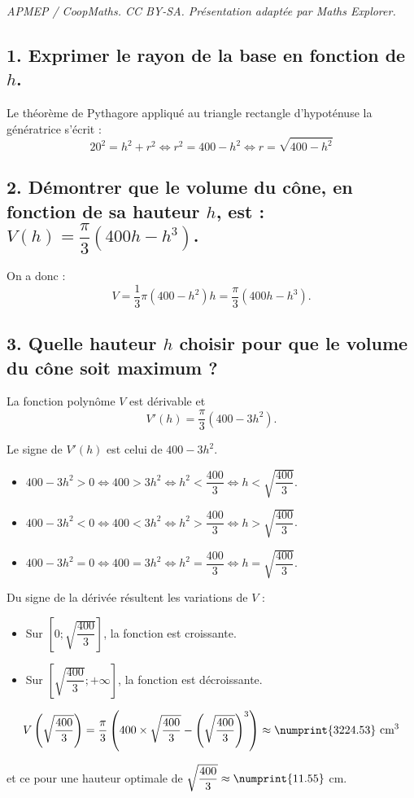 \documentclass[10pt]{article}
\begin{document}
\noindent\textit{APMEP / CoopMaths. CC BY-SA. Présentation adaptée par Maths Explorer.}\par\medskip
\subsection*{1. Exprimer le rayon de la base en fonction de $h$.}
	
	Le théorème de Pythagore appliqué au triangle rectangle d'hypoténuse la génératrice s'écrit :
	\[
	20^2 = h^2 + r^2 \iff r^2 = 400 - h^2 \iff r = \sqrt{400 - h^2}
	\]
	
	\subsection*{2. Démontrer que le volume du cône, en fonction de sa hauteur $h$, est : $V(h) = \dfrac{\pi}{3}(400h - h^3)$.}
	
	On a donc :
	\[
	V = \dfrac{1}{3} \pi (400 - h^2)h = \dfrac{\pi}{3}(400h - h^3).
	\]
	
	\subsection*{3. Quelle hauteur $h$ choisir pour que le volume du cône soit maximum ?}
	
	La fonction polynôme $V$ est dérivable et
	\[
	V'(h) = \dfrac{\pi}{3}(400 - 3h^2).
	\]
	
	Le signe de $V'(h)$ est celui de $400 - 3h^2$.
	\begin{itemize}
		\item $400 - 3h^2 > 0 \iff 400 > 3h^2 \iff h^2 < \dfrac{400}{3} \iff h < \sqrt{\dfrac{400}{3}}$.
		\item $400 - 3h^2 < 0 \iff 400 < 3h^2 \iff h^2 > \dfrac{400}{3} \iff h > \sqrt{\dfrac{400}{3}}$.
		\item $400 - 3h^2 = 0 \iff 400 = 3h^2 \iff h^2 = \dfrac{400}{3} \iff h = \sqrt{\dfrac{400}{3}}$.
	\end{itemize}
	
	Du signe de la dérivée résultent les variations de $V$ :
	\begin{itemize}
		\item Sur $[0; \sqrt{\dfrac{400}{3}}]$, la fonction est croissante.
		\item Sur $[\sqrt{\dfrac{400}{3}}; +\infty]$, la fonction est décroissante.
	\end{itemize}
	
	\[
	V\left(\sqrt{\dfrac{400}{3}}\right) = \dfrac{\pi}{3}\left(400 \times \sqrt{\dfrac{400}{3}} - \left(\sqrt{\dfrac{400}{3}}\right)^3\right) \approx \numprint{3224.53} \text{ cm}^3
	\]
	
	et ce pour une hauteur optimale de $\sqrt{\dfrac{400}{3}} \approx \numprint{11.55}$ cm.
\end{document}
